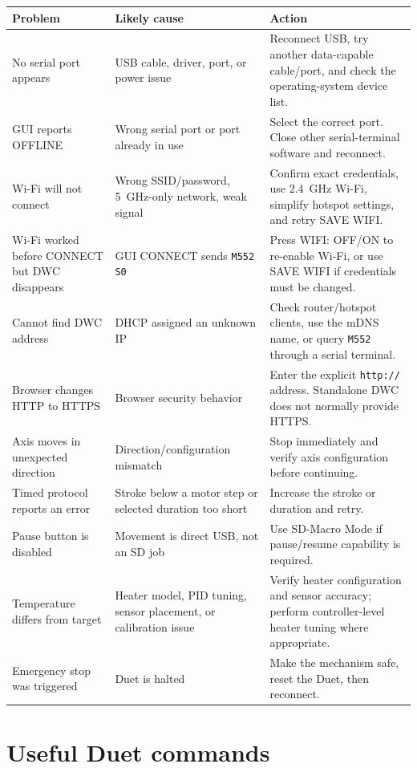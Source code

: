 \documentclass[11pt,a4paper]{article}
\begin{document}
\begin{longtable}{p{} p{} p{}}
\toprule
Problem & Likely cause & Action \\
\midrule
\endhead
No serial port appears & USB cable, driver, port, or power issue & Reconnect USB, try another data-capable cable/port, and check the operating-system device list. \\
GUI reports OFFLINE & Wrong serial port or port already in use & Select the correct port. Close other serial-terminal software and reconnect. \\
Wi-Fi will not connect & Wrong SSID/password, 5~GHz-only network, weak signal & Confirm exact credentials, use 2.4~GHz Wi-Fi, simplify hotspot settings, and retry SAVE WIFI. \\
Wi-Fi worked before CONNECT but DWC disappears & GUI CONNECT sends \texttt{M552 S0} & Press WIFI: OFF/ON to re-enable Wi-Fi, or use SAVE WIFI if credentials must be changed. \\
Cannot find DWC address & DHCP assigned an unknown IP & Check router/hotspot clients, use the mDNS name, or query \texttt{M552} through a serial terminal. \\
Browser changes HTTP to HTTPS & Browser security behavior & Enter the explicit \texttt{http://} address. Standalone DWC does not normally provide HTTPS. \\
Axis moves in unexpected direction & Direction/configuration mismatch & Stop immediately and verify axis configuration before continuing. \\
Timed protocol reports an error & Stroke below a motor step or selected duration too short & Increase the stroke or duration and retry. \\
Pause button is disabled & Movement is direct USB, not an SD job & Use SD-Macro Mode if pause/resume capability is required. \\
Temperature differs from target & Heater model, PID tuning, sensor placement, or calibration issue & Verify heater configuration and sensor accuracy; perform controller-level heater tuning where appropriate. \\
Emergency stop was triggered & Duet is halted & Make the mechanism safe, reset the Duet, then reconnect. \\
\bottomrule
\end{longtable}

\section{Useful Duet commands}
\end{document}
